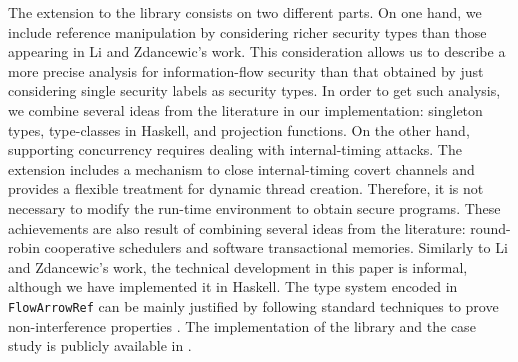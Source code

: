 \documentclass[times, 10pt,twocolumn]{article}
\begin{document}
{The extension to the library consists on two different parts.
On one hand, we include reference manipulation by  
considering richer security types than those appearing in Li and 
Zdancewic's work. This consideration allows us to describe a more 
precise analysis for information-flow security than 
that obtained by just considering single security labels as  
security types. 
In order to get such analysis, 
we combine several ideas from the literature 
in our implementation: singleton types, type-classes in Haskell, 
and projection functions. 
On the other hand, supporting concurrency requires dealing  
with internal-timing attacks. 
The extension includes a mechanism to close internal-timing
covert channels and provides  
a flexible treatment for dynamic thread creation.
Therefore, it is not necessary to modify the run-time 
environment to obtain secure programs.
These achievements are also result of combining several
ideas from the literature: round-robin cooperative schedulers and 
software transactional memories. 
Similarly to Li and Zdancewic's work, the technical 
development in this paper is informal, although we have implemented it
in Haskell.
The type system encoded in {\texttt{FlowArrowRef}} can
be mainly justified by following
standard techniques to prove non-interference properties
\cite{Volpano:Smith:Irvine:Sound,Pottier:Simonet:POPL02}. 
The
implementation of the library and the case study is publicly available in 
\cite{flowarrowref}.


}
\end{document}
